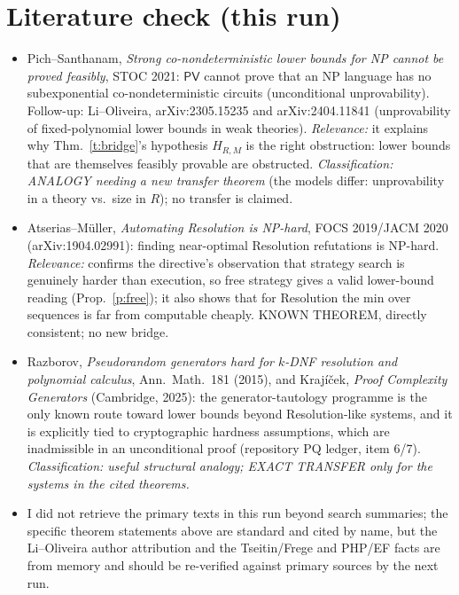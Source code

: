 \documentclass[11pt]{article}
\theoremstyle{remark}
\begin{document}
\section{Literature check (this run)}
\begin{itemize}
\item Pich--Santhanam, \emph{Strong co-nondeterministic lower bounds for NP cannot be proved feasibly}, STOC 2021:
$\mathsf{PV}$ cannot prove that an NP language has no subexponential co-nondeterministic circuits (unconditional
unprovability). Follow-up: Li--Oliveira, arXiv:2305.15235 and arXiv:2404.11841 (unprovability of fixed-polynomial
lower bounds in weak theories). \emph{Relevance:} it explains why Thm.~\ref{t:bridge}'s hypothesis
$H_{R,M}$ is the right obstruction: lower bounds that are themselves feasibly provable are obstructed.
\emph{Classification: ANALOGY needing a new transfer theorem} (the models differ: unprovability in a theory vs.\ size
in $R$); no transfer is claimed.
\item Atserias--M\"uller, \emph{Automating Resolution is NP-hard}, FOCS 2019/JACM 2020 (arXiv:1904.02991): finding
near-optimal Resolution refutations is NP-hard. \emph{Relevance:} confirms the directive's observation that strategy
search is genuinely harder than execution, so free strategy gives a valid lower-bound reading (Prop.~\ref{p:free}); it also shows that for Resolution
the min over sequences is far from computable cheaply. KNOWN THEOREM, directly consistent; no new bridge.
\item Razborov, \emph{Pseudorandom generators hard for $k$-DNF resolution and polynomial calculus}, Ann.\ Math.\ 181 (2015),
and Krajíček, \emph{Proof Complexity Generators} (Cambridge, 2025): the generator-tautology programme is the
only known route toward lower bounds beyond Resolution-like systems, and it is explicitly tied to
cryptographic hardness assumptions, which are inadmissible in an unconditional proof (repository PQ ledger, item 6/7).
\emph{Classification: useful structural analogy; EXACT TRANSFER only for the systems in the cited theorems.}
\item I did not retrieve the primary texts in this run beyond search summaries; the specific theorem statements above
are standard and cited by name, but the Li--Oliveira author attribution and the Tseitin/Frege and PHP/EF facts
are from memory and should be re-verified against primary sources by the next run.
\end{itemize}
\end{document}
